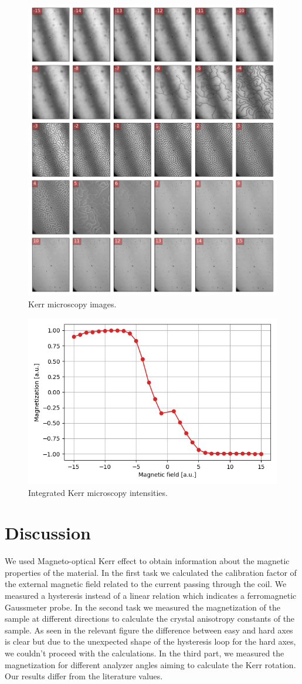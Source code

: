 \documentclass{article}
\begin{document}
\begin{figure}[h!]
\centering
\includegraphics[width=0.8\linewidth]{LAB/MOKE/domains.png}
\caption{Kerr microscopy images.}
\label{fig:exp_setup}
\end{figure}

\begin{figure}[h!]
\centering
\includegraphics[width=0.6\linewidth]{LAB/MOKE/kerr_mic_loop.png}
\caption{Integrated Kerr microscopy intensities.}
\label{fig:exp_setup}
\end{figure}

\clearpage
\section{Discussion}
We used Magneto-optical Kerr effect to obtain information about the magnetic properties of the material. In the first task we calculated the calibration factor of the external magnetic field related to the current passing through the coil. We measured a hysteresis instead of a linear relation which indicates a ferromagnetic Gaussmeter probe. In the second task we measured the magnetization of the sample at different directions to calculate the crystal anisotropy constants of the sample. As seen in the relevant figure the difference between easy and hard axes is clear but due to the unexpected shape of the hysteresis loop for the hard axes, we couldn't proceed with the calculations. In the third part, we measured the magnetization for different analyzer angles aiming to calculate the Kerr rotation. Our results differ from the literature values.
\end{document}
